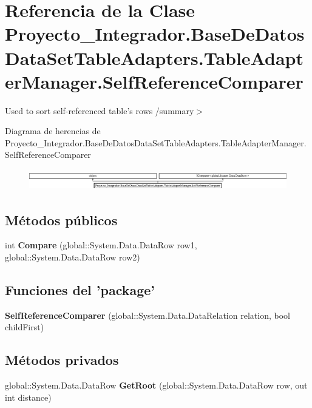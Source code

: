 \section{Referencia de la Clase Proyecto\-\_\-\-Integrador.\-Base\-De\-Datos\-Data\-Set\-Table\-Adapters.\-Table\-Adapter\-Manager.\-Self\-Reference\-Comparer}
\label{class_proyecto___integrador_1_1_base_de_datos_data_set_table_adapters_1_1_table_adapter_manager_1_1_self_reference_comparer}


Used to sort self-\/referenced table's rows /summary$>$  


Diagrama de herencias de Proyecto\-\_\-\-Integrador.\-Base\-De\-Datos\-Data\-Set\-Table\-Adapters.\-Table\-Adapter\-Manager.\-Self\-Reference\-Comparer\begin{figure}[H]
\begin{center}
\leavevmode
\includegraphics[height=0.912052cm]{class_proyecto___integrador_1_1_base_de_datos_data_set_table_adapters_1_1_table_adapter_manager_1_1_self_reference_comparer}
\end{center}
\end{figure}
\subsection*{Métodos públicos}
\begin{DoxyCompactItemize}
\item 
int {\bf Compare} (global\-::\-System.\-Data.\-Data\-Row row1, global\-::\-System.\-Data.\-Data\-Row row2)
\end{DoxyCompactItemize}
\subsection*{Funciones del 'package'}
\begin{DoxyCompactItemize}
\item 
{\bf Self\-Reference\-Comparer} (global\-::\-System.\-Data.\-Data\-Relation relation, bool child\-First)
\end{DoxyCompactItemize}
\subsection*{Métodos privados}
\begin{DoxyCompactItemize}
\item 
global\-::\-System.\-Data.\-Data\-Row {\bf Get\-Root} (global\-::\-System.\-Data.\-Data\-Row row, out int distance)
\end{DoxyCompactItemize}
